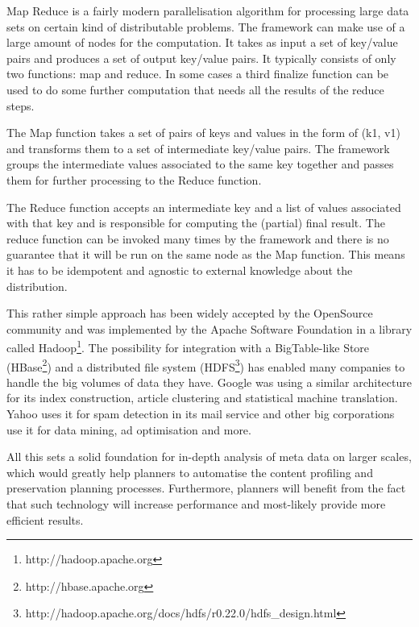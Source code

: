 Map Reduce is a fairly modern parallelisation algorithm for processing large data sets on certain kind of distributable problems. The framework can make use of a large amount of nodes for the computation. It takes as input a set of key/value pairs and produces a set of output key/value pairs. It typically consists of only two functions: map and reduce. In some cases a third finalize function can be used to do some further computation that needs all the results of the reduce steps.

The Map function takes a set of pairs of keys and values in the form of (k1, v1) and transforms them to a set of intermediate key/value pairs. The framework groups the intermediate values associated to the same key together and passes them for further processing to the Reduce function.

The Reduce function accepts an intermediate key and a list of values associated with that key and is responsible for computing the (partial) final result. The reduce function can be invoked many times by the framework and there is no guarantee that it will be run on the same node as the Map function. This means it has to be idempotent and agnostic to external knowledge about the distribution.

This rather simple approach has been widely accepted by the OpenSource community and was implemented by the Apache Software Foundation in a library called Hadoop\footnote{http://hadoop.apache.org}. The possibility for integration with a BigTable-like Store \cite{Chang:2008:BDS:1365815.1365816} (HBase\footnote{http://hbase.apache.org}) and a distributed file system (HDFS\footnote{http://hadoop.apache.org/docs/hdfs/r0.22.0/hdfs\_design.html}) has enabled many companies to handle the big volumes of data they have. Google was using a similar architecture for its index construction, article clustering and statistical machine translation. Yahoo uses it for spam detection in its mail service and other big corporations use it for data mining, ad optimisation and more.

All this sets a solid foundation for in-depth analysis of meta data on larger scales, which would greatly help planners to automatise the content profiling and preservation planning processes. Furthermore, planners will benefit from the fact that such technology will increase performance and most-likely provide more efficient results.

